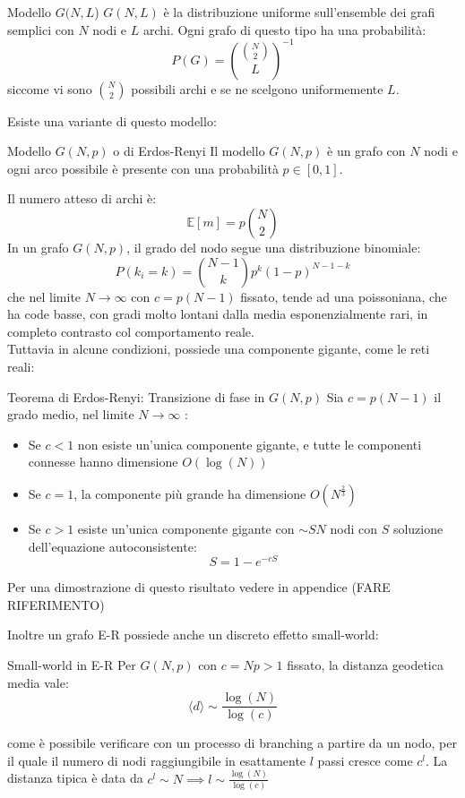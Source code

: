\begin{boxb} {Modello $G(N,L$)}
$G(N,L)$ è la distribuzione uniforme sull'ensemble dei grafi semplici con $N$ nodi e $L$ archi. Ogni grafo di questo tipo ha una probabilità:
\begin{equation}
  P(G)=\binom{\binom{N}{2} }{L}^{-1}  
\end{equation}
siccome vi sono $\binom{N}{2}$ possibili archi e se ne scelgono uniformemente $L$.
\end{boxb}
Esiste una variante di questo modello:
\begin{boxb}{Modello $G(N,p)$ o di Erdos-Renyi}
  Il modello $G(N,p)$ è un grafo con $N$ nodi e ogni arco possibile è presente con una probabilità $p \in [0,1]$.
\end{boxb}
Il numero atteso di archi è:
\begin{equation}
  \mathbb{E}[m]=p\binom{N}{2}
\end{equation}
In un grafo $G(N,p)$, il grado del nodo segue una distribuzione binomiale:
\begin{equation}
  P(k_i=k)=\binom{N-1}{k}p^k(1-p)^{N-1-k}
\end{equation}
che nel limite $N \to \infty$ con $c=p(N-1)$ fissato, tende ad una poissoniana, che ha code basse, con gradi molto lontani dalla media esponenzialmente rari, in completo contrasto col comportamento reale.\\

Tuttavia in alcune condizioni, possiede una componente gigante, come le reti reali:
\begin{boxl}{Teorema di Erdos-Renyi: Transizione di fase in $G(N,p)$}
Sia $c=p(N-1)$ il grado medio, nel limite $N \to \infty$ :
\begin{itemize}
  \item Se $c <1$ non esiste un'unica componente gigante, e tutte le componenti connesse hanno dimensione $O(\log(N))$
  \item Se $c=1$, la componente più grande ha dimensione $O(N^{\frac{2}{3}})$
  \item Se $c >1$ esiste un'unica componente gigante con $\sim S N$ nodi con $S$ soluzione dell'equazione autoconsistente:
  \begin{equation}
    S=1-e^{-cS}
  \end{equation}
\end{itemize}
\end{boxl}
Per una dimostrazione di questo risultato vedere in appendice (FARE RIFERIMENTO)

Inoltre un grafo E-R possiede anche un discreto effetto small-world:
\begin{boxl}{Small-world in E-R}
Per $G(N,p)$ con $c=Np >1$ fissato, la distanza geodetica media vale:
\begin{equation}
  \langle d \rangle \sim \frac{\log(N)}{\log(c)} 
\end{equation}
\end{boxl}
come è possibile verificare con un processo di branching a partire da un nodo, per il quale il numero di nodi raggiungibile in esattamente $l$ passi cresce come $c^l$. La distanza tipica è data da $c^l\sim N \implies l \sim \frac{\log(N)}{\log(c)} $

